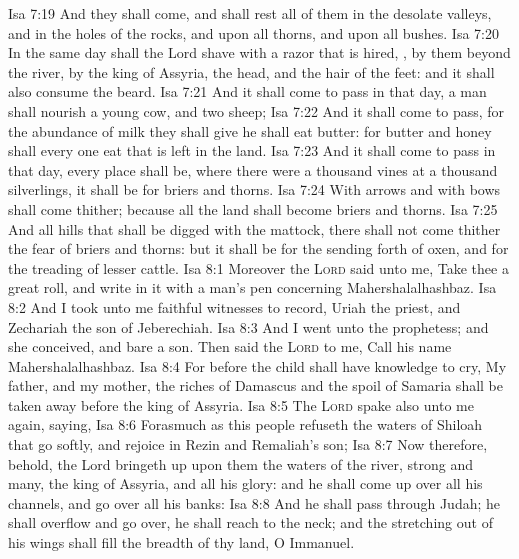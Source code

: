 \vs Isa 7:19 And they shall come, and shall rest all of them in the desolate valleys, and in the holes of the rocks, and upon all thorns, and upon all bushes.
\vs Isa 7:20 In the same day shall the Lord shave with a razor that is hired, , by them beyond the river, by the king of Assyria, the head, and the hair of the feet: and it shall also consume the beard.
\vs Isa 7:21 And it shall come to pass in that day,  a man shall nourish a young cow, and two sheep;
\vs Isa 7:22 And it shall come to pass, for the abundance of milk  they shall give he shall eat butter: for butter and honey shall every one eat that is left in the land.
\vs Isa 7:23 And it shall come to pass in that day,  every place shall be, where there were a thousand vines at a thousand silverlings, it shall  be for briers and thorns.
\vs Isa 7:24 With arrows and with bows shall  come thither; because all the land shall become briers and thorns.
\vs Isa 7:25 And  all hills that shall be digged with the mattock, there shall not come thither the fear of briers and thorns: but it shall be for the sending forth of oxen, and for the treading of lesser cattle.
\vs Isa 8:1 Moreover the \textsc{Lord} said unto me, Take thee a great roll, and write in it with a man's pen concerning Mahershalalhashbaz.
\vs Isa 8:2 And I took unto me faithful witnesses to record, Uriah the priest, and Zechariah the son of Jeberechiah.
\vs Isa 8:3 And I went unto the prophetess; and she conceived, and bare a son. Then said the \textsc{Lord} to me, Call his name Mahershalalhashbaz.
\vs Isa 8:4 For before the child shall have knowledge to cry, My father, and my mother, the riches of Damascus and the spoil of Samaria shall be taken away before the king of Assyria.
\vs Isa 8:5 The \textsc{Lord} spake also unto me again, saying,
\vs Isa 8:6 Forasmuch as this people refuseth the waters of Shiloah that go softly, and rejoice in Rezin and Remaliah's son;
\vs Isa 8:7 Now therefore, behold, the Lord bringeth up upon them the waters of the river, strong and many,  the king of Assyria, and all his glory: and he shall come up over all his channels, and go over all his banks:
\vs Isa 8:8 And he shall pass through Judah; he shall overflow and go over, he shall reach  to the neck; and the stretching out of his wings shall fill the breadth of thy land, O Immanuel.
